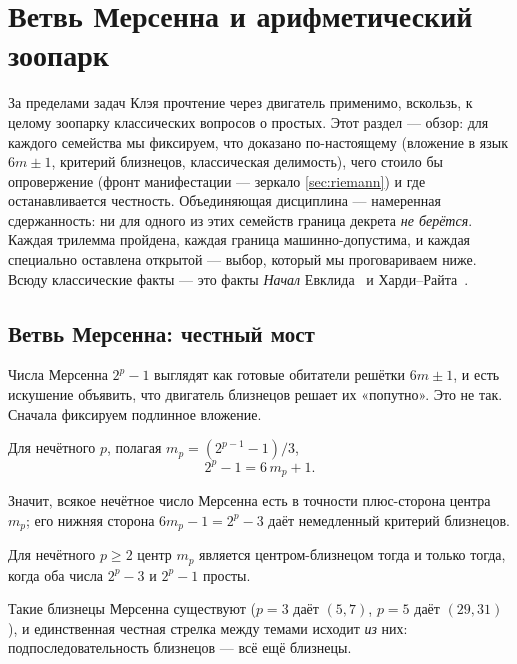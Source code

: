 \section{Ветвь Мерсенна и арифметический зоопарк}\label{sec:zoo}

За пределами задач Клэя прочтение через двигатель применимо, вскользь, к целому зоопарку
классических вопросов о простых. Этот раздел --- обзор: для каждого семейства мы фиксируем, что
доказано по-настоящему (вложение в язык $6m\pm1$, критерий близнецов, классическая делимость),
чего стоило бы опровержение (фронт манифестации --- зеркало \cref{sec:riemann}) и где
останавливается честность. Объединяющая дисциплина --- намеренная сдержанность: ни для одного из
этих семейств граница декрета \emph{не берётся}. Каждая трилемма пройдена, каждая граница
машинно-допустима, и каждая специально оставлена открытой --- выбор, который мы проговариваем ниже.
Всюду классические факты --- это факты \emph{Начал} Евклида~\cite{euclid-elements} и
Харди--Райта~\cite{hardy-wright}.

\subsection{Ветвь Мерсенна: честный мост}

Числа Мерсенна $2^p-1$ выглядят как готовые обитатели решётки $6m\pm1$, и есть искушение объявить,
что двигатель близнецов решает их «попутно». Это не так. Сначала фиксируем подлинное вложение.

\begin{theorem}\label{thm:mersenne_eq_sixCenter_add_one}
\green{}\; Для нечётного $p$, полагая $m_p=(2^{p-1}-1)/3$,
\begin{equation}\label{eq:mersenne-embed}
  2^p-1 = 6\,m_p+1.
\end{equation}
\end{theorem}

Значит, всякое нечётное число Мерсенна есть в точности плюс-сторона центра $m_p$; его нижняя
сторона $6m_p-1 = 2^p-3$ даёт немедленный критерий близнецов.

\begin{theorem}\label{thm:isTwinCenter_mersenneCenter_iff}
\green{}\; Для нечётного $p\ge 2$ центр $m_p$ является центром-близнецом тогда и только тогда, когда
оба числа $2^p-3$ и $2^p-1$ просты.
\end{theorem}

Такие близнецы Мерсенна существуют ($p=3$ даёт $(5,7)$, $p=5$ даёт $(29,31)$), и единственная
честная стрелка между темами исходит \emph{из} них: подпоследовательность близнецов --- всё ещё
близнецы.

